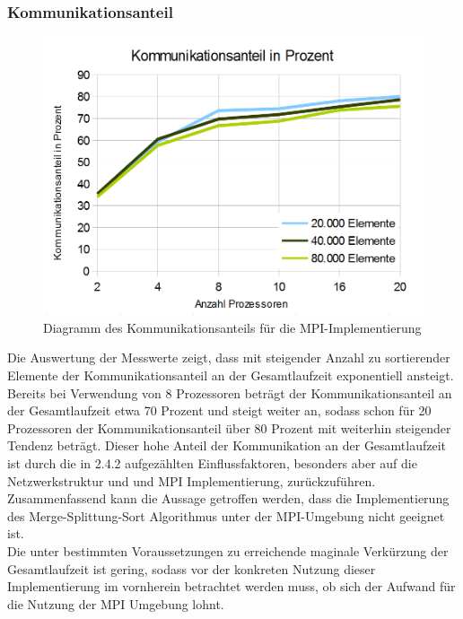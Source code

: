 \documentclass[a4paper,12pt]{scrartcl}
\begin{document}
\subsubsection{Kommunikationsanteil}
\begin{figure}[htb]
  \begin{center}
    \includegraphics[width=1\hsize]{../Kommunikationsanteil.PNG}
  \end{center}
  \caption{\label{mpikommoverhead}
    Diagramm des Kommunikationsanteils f\"ur die MPI-Implementierung}
\end{figure}
Die Auswertung der Messwerte zeigt, dass mit steigender Anzahl zu sortierender Elemente der Kommunikationsanteil an der Gesamtlaufzeit exponentiell ansteigt.
Bereits bei Verwendung von 8 Prozessoren betr\"agt der Kommunikationsanteil an der Gesamtlaufzeit etwa 70 Prozent und steigt weiter an, sodass schon
f\"ur 20 Prozessoren der Kommunikationsanteil \"uber 80 Prozent mit weiterhin steigender Tendenz betr\"agt.
Dieser hohe Anteil der Kommunikation an der Gesamtlaufzeit ist durch die in 2.4.2 aufgez\"ahlten Einflussfaktoren, besonders aber auf die Netzwerkstruktur und
und MPI Implementierung, zur\"uckzuf\"uhren.\\

Zusammenfassend kann die Aussage getroffen werden, dass die Implementierung des Merge-Splittung-Sort Algorithmus unter der MPI-Umgebung nicht geeignet ist.\\
Die unter bestimmten Voraussetzungen zu erreichende maginale Verk\"urzung der Gesamtlaufzeit ist gering, sodass vor der konkreten Nutzung dieser
Implementierung im vornherein betrachtet werden muss, ob sich der Aufwand für die Nutzung der MPI Umgebung lohnt.
\end{document}
